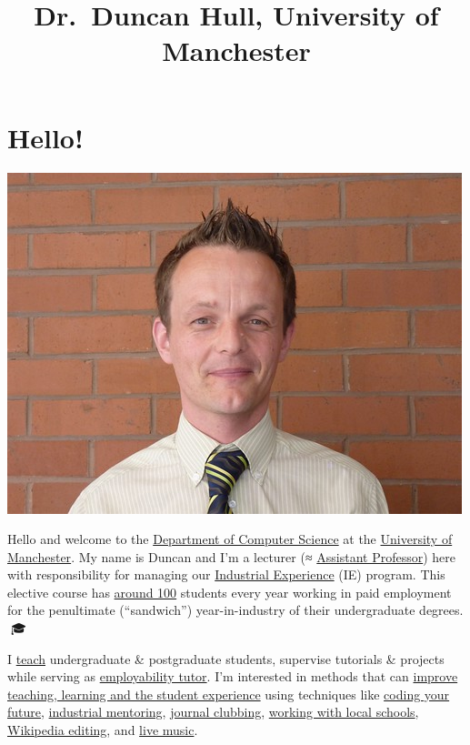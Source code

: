 \documentclass[
  12pt,
]{book}
\title{Dr.~Duncan Hull, University of Manchester}
\author{}
\date{\vspace{-2.5em}}
\begin{document}
\maketitle

{
\setcounter{tocdepth}{1}
\tableofcontents
}
\hypertarget{hello}{%
\chapter*{Hello!}\label{hello}}

\begin{center}\includegraphics[width=0.5\linewidth]{images/duncan hull} \end{center}

Hello and welcome to the \href{https://www.cs.manchester.ac.uk/}{Department of Computer Science} at the \href{https://www.manchester.ac.uk}{University of Manchester}. My name is Duncan and I'm a lecturer (≈ \href{https://en.wikipedia.org/wiki/Assistant_professor}{Assistant Professor}) here with responsibility for managing our \href{https://www.cs.manchester.ac.uk/study/undergraduate/industrial-experience/}{Industrial Experience} (IE) program. This elective course has \protect\hyperlink{employability}{around 100} students every year working in paid employment for the penultimate (``sandwich'') year-in-industry of their undergraduate degrees. 🥪🎓

I \href{http://www.cs.man.ac.uk/~hulld/teaching.html}{teach} undergraduate \& postgraduate students, supervise tutorials \& projects while serving as \href{http://studentnet.cs.manchester.ac.uk/employment/placement/}{employability tutor}. I'm interested in methods that can \href{http://www.cs.man.ac.uk/~hulld/research.html}{improve teaching, learning and the student experience} using techniques like \href{https://www.cdyf.me}{coding your future}, \href{https://www.cs.manchester.ac.uk/connect/business-engagement/industrial-mentoring/}{industrial mentoring}, \href{https://sigcse.cs.manchester.ac.uk/}{journal clubbing}, \href{http://www.cs.man.ac.uk/~hulld/coding-their-future.html}{working with local schools}, \protect\hyperlink{wikipedia}{Wikipedia editing}, and \protect\hyperlink{tuningcomplete}{live music}. 🎸
\end{document}
